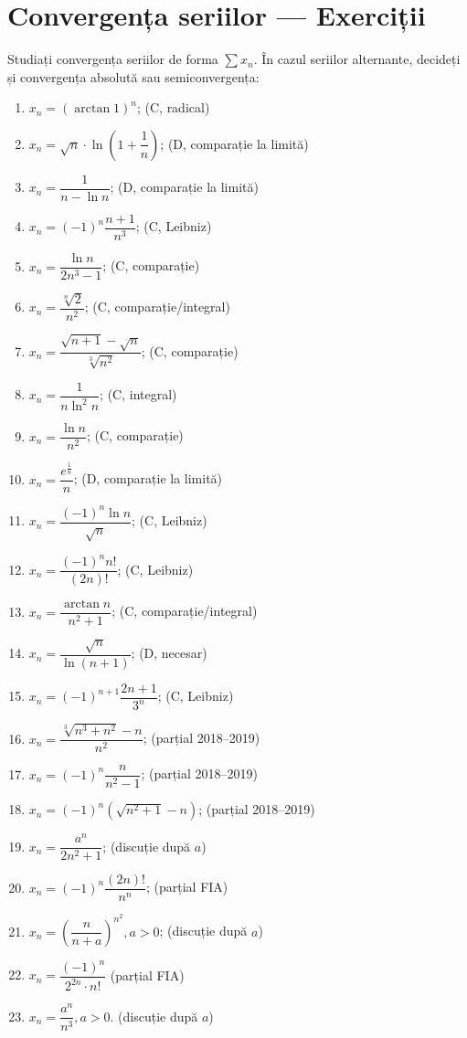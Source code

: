 \chapter{Convergența seriilor --- Exerciții}

Studiați convergența seriilor de forma $ \sum x_n $. În cazul
seriilor alternante, decideți și convergența absolută sau semiconvergența:
\begin{enumerate}[(1)]
    \item $ x_n = (\arctan 1)^n $; \hfill(C, radical)
    \item $ x_n = \sqrt{n} \cdot \ln \left( 1 + \dfrac{1}{n} \right) $; \hfill(D, comparație la limită)
    \item $ x_n = \dfrac{1}{n - \ln n} $; \hfill(D, comparație la limită)
    \item $ x_n = (-1)^n \dfrac{n + 1}{n^3} $; \hfill(C, Leibniz)
    \item $ x_n = \dfrac{\ln n}{2n^3 - 1} $; \hfill(C, comparație)
    \item $ x_n = \dfrac{\sqrt[n]{2}}{n^2} $; \hfill(C, comparație/integral)
    \item $ x_n = \dfrac{\sqrt{n + 1} - \sqrt{n}}{\sqrt[3]{n^2}} $; \hfill(C, comparație)
    \item $ x_n = \dfrac{1}{n \ln^2 n} $; \hfill(C, integral)
    \item $ x_n = \dfrac{\ln n}{n^2} $; \hfill(C, comparație)
    \item $ x_n = \dfrac{e^\frac{1}{n}}{n} $; \hfill(D, comparație la limită)
    \item $ x_n = \dfrac{(-1)^n \ln n}{\sqrt{n}} $; \hfill(C, Leibniz)
    \item $ x_n = \dfrac{(-1)^n n!}{(2n)!} $; \hfill(C, Leibniz)
    \item $ x_n = \dfrac{\arctan n}{n^2 + 1} $; \hfill(C, comparație/integral)
    \item $ x_n = \dfrac{\sqrt{n}}{\ln(n + 1)} $; \hfill(D, necesar)
    \item $ x_n = (-1)^{n+1} \dfrac{2n + 1}{3^n} $; \hfill(C, Leibniz)
    \item $ x_n = \dfrac{\sqrt[3]{n^3 + n^2} - n}{n^2} $; \hfill(parțial 2018--2019)
    \item $ x_n = (-1)^n \dfrac{n}{n^2 - 1} $; \hfill(parțial 2018--2019)
    \item $ x_n = (-1)^n (\sqrt{n^2 + 1} - n) $; \hfill(parțial 2018--2019)
    \item $ x_n = \dfrac{a^n}{2n^2 + 1} $; \hfill(discuție după $ a $)
    \item $ x_n = (-1)^n \dfrac{(2n)!}{n^n} $; \hfill(parțial FIA)
    \item $ x_n = \left( \dfrac{n}{n + a} \right)^{n^2}, a > 0 $; \hfill(discuție după $ a $)
    \item $ x_n = \dfrac{(-1)^n}{2^{2n} \cdot n!} $ \hfill(parțial FIA)
    \item $ x_n = \dfrac{a^n}{n^3}, a > 0 $. \hfill(discuție după $ a $)
\end{enumerate}

